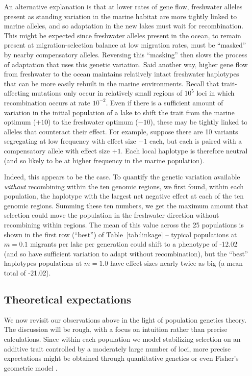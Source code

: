 \documentclass{article}
\begin{document}
An alternative explanation is that at lower rates of gene flow,
freshwater alleles present as standing variation in the marine habitat
are more tightly linked to marine alleles,
and so adaptation in the new lakes must wait for recombination.
This might be expected since freshwater alleles present in the ocean,
to remain present at migration-selection balance at low migration rates,
must be ``masked'' by nearby compensatory alleles.
Reversing this ``masking'' then slows the process of adaptation that uses this genetic variation.
Said another way,
higher gene flow from freshwater to the ocean
maintains relatively intact freshwater haplotypes
that can be more easily rebuilt in the marine environments.
Recall that trait-affecting mutations only occur in relatively small regions of $10^5$ loci
in which recombination occurs at rate $10^{-2}$.
Even if there is a sufficient amount of variation in the initial population of a lake
to shift the trait from the marine optimum ($+10$) to the freshwater optimum ($-10$),
these may be tightly linked to alleles that counteract their effect.
For example, suppose there are 10 variants segregating at low frequency with effect size $-1$ each,
but each is paired with a compensatory allele with effect size $+1$.
Each local haplotype is therefore neutral
(and so likely to be at higher frequency in the marine population).

Indeed, this appears to be the case.
To quantify the genetic variation available \emph{without} recombining within the ten genomic regions,
we first found, within each population, the haplotype with the largest net negative effect
at each of the ten genomic regions.
Summing these ten numbers, 
we get the maximum amount that selection could move the population in the freshwater direction
without recombining within regions.
The mean of this value across the 25 populations is shown 
in the first row (``best'') of Table~\ref{tab:linkage} --
typical populations at $m=0.1$ migrants per lake per generation could shift to a phenotype of -12.02
(and so have sufficient variation to adapt without recombination),
but the ``best'' haplotypes populations at $m=1.0$ have effect sizes nearly twice as big 
(a mean total of -21.02).

\subsection*{Theoretical expectations}

We now revisit our observations above
in the light of population genetics theory.
The discussion will be rough,
with a focus on intuition rather than precise calculations.
Since within each population we model stabilizing selection on an additive trait
controlled by a moderately large number of loci,
more precise expectations might be obtained through quantitative genetics \citep{svardal2014general}
or even Fisher's geometric model \citep{barton2001hybridization,chevin2014niche}.
\end{document}

